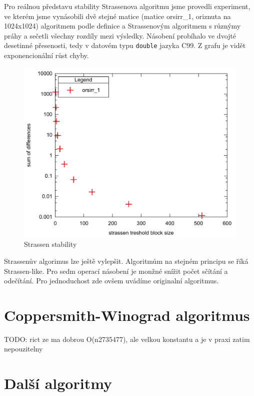 \documentclass[thesis=B,czech]{FITthesis}[2012/06/26]
\begin{document}

Pro reálnou představu stability Strassenova algoritmu jsme provedli experiment, ve kterém jsme vynásobili dvě stejné matice (matice orsirr\_1, oriznuta na 1024x1024) algoritmem podle definice a Strassenovým algoritmem s různýmy práhy a sečetli všechny rozdíly mezi výsledky. Násobení probíhalo ve dvojté desetinné přesenosti, tedy v datovém typu \texttt{double} jazyka C99. Z grafu je vidět exponencionální růst chyby.

\begin{figure}[H]\centering
	\includegraphics[width=\textwidth]{./images/strassen_stability}
	\caption{Strassen stability}
	\label{fig:Ukázka numerické stability Strassenova algoritmu}
\end{figure}

Strassenův algorimus lze ještě vylepšit. Algoritmům na stejném principu se říká Strassen-like. Pro sedm operací násobení je monžné snížit počet sčítání a odečítání. Pro jednoduchost zde ovšem uvádíme originalní algoritmus.

\section{Coppersmith-Winograd algoritmus}

TODO: rict ze ma dobrou O(n2735477), ale velkou konstantu a je v praxi zatim nepouzitelny

\section{Další algoritmy}
\end{document}
